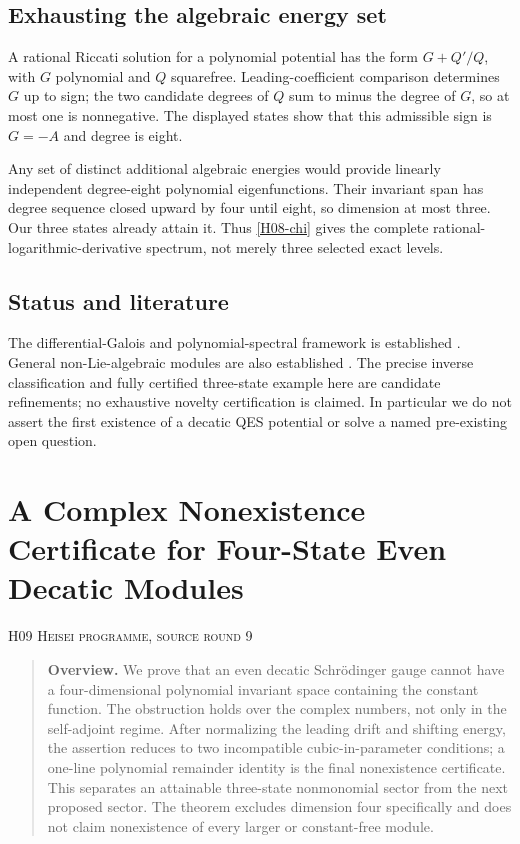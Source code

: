 \documentclass[11pt,a4paper]{article}
\theoremstyle{definition}\newtheorem{definition}[theorem]{Definition}
\theoremstyle{remark}\newtheorem{remark}[theorem]{Remark}
\numberwithin{equation}{section}
\begin{document}
\subsection{Exhausting the algebraic energy set}\label{H08-sec-6}
A rational Riccati solution for a polynomial potential has the form $G+Q'/Q$, with $G$ polynomial and $Q$ squarefree. Leading-coefficient comparison determines $G$ up to sign; the two candidate degrees of $Q$ sum to minus the degree of $G$, so at most one is nonnegative. The displayed states show that this admissible sign is $G=-A$ and degree is eight.

Any set of distinct additional algebraic energies would provide linearly independent degree-eight polynomial eigenfunctions. Their invariant span has degree sequence closed upward by four until eight, so dimension at most three. Our three states already attain it. Thus \eqref{H08-chi} gives the complete rational-logarithmic-derivative spectrum, not merely three selected exact levels.
\subsection{Status and literature}\label{H08-sec-7}
The differential-Galois and polynomial-spectral framework is established \cite{ref080}. General non-Lie-algebraic modules are also established \cite{ref088}. The precise inverse classification and fully certified three-state example here are candidate refinements; no exhaustive novelty certification is claimed. In particular we do not assert the first existence of a decatic QES potential or solve a named pre-existing open question.




\clearpage
\section[H09 --- A Complex Nonexistence Certificate for Four-State Even Decatic Modules]{A Complex Nonexistence Certificate for Four-State Even Decatic Modules}\label{contrib-H09}
\noindent\textsc{H09 \quad Heisei programme, source round 9}\par\medskip






\begin{quote}\small\textbf{Overview.} We prove that an even decatic Schr\"odinger gauge cannot have a four-dimensional polynomial invariant space containing the constant function. The obstruction holds over the complex numbers, not only in the self-adjoint regime. After normalizing the leading drift and shifting energy, the assertion reduces to two incompatible cubic-in-parameter conditions; a one-line polynomial remainder identity is the final nonexistence certificate. This separates an attainable three-state nonmonomial sector from the next proposed sector. The theorem excludes dimension four specifically and does not claim nonexistence of every larger or constant-free module.\end{quote}
\end{document}
